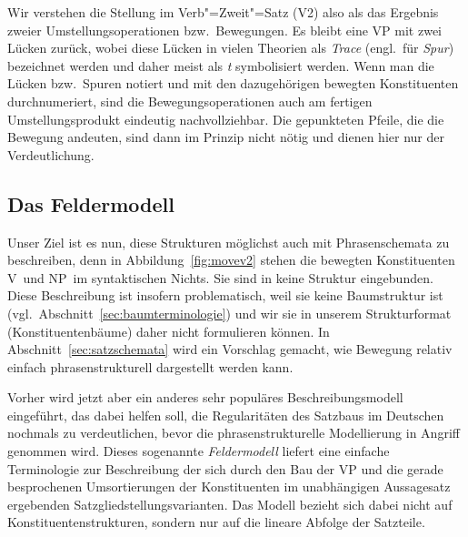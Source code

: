 
Wir verstehen die Stellung im Verb"=Zweit"=Satz (V2) also als das Ergebnis zweier Umstellungsoperationen bzw.\ Bewegungen.
Es bleibt eine VP mit zwei Lücken zurück, wobei diese Lücken in vielen Theorien als \textit{Trace} (engl.\ für \textit{Spur}) bezeichnet werden und daher meist als \textit{t} symbolisiert werden.
Wenn man die Lücken bzw.\ Spuren notiert und mit den dazugehörigen bewegten Konstituenten durchnumeriert, sind die Bewegungsoperationen auch am fertigen Umstellungsprodukt eindeutig nachvollziehbar.
Die gepunkteten Pfeile, die die Bewegung andeuten, sind dann im Prinzip nicht nötig und dienen hier nur der Verdeutlichung.

\subsection{Das Feldermodell}

Unser Ziel ist es nun, diese Strukturen möglichst auch mit Phrasenschemata zu beschreiben, denn in Abbildung~\ref{fig:movev2} stehen die bewegten Konstituenten V\ORi\ und NP\ORii\ im syntaktischen Nichts.
Sie sind in keine Struktur eingebunden.
Diese Beschreibung ist insofern problematisch, weil sie keine Baumstruktur ist (vgl.\ Abschnitt~\ref{sec:baumterminologie}) und wir sie in unserem Strukturformat (Konstituentenbäume) daher nicht formulieren können.
In Abschnitt~\ref{sec:satzschemata} wird ein Vorschlag gemacht, wie Bewegung relativ einfach phrasenstrukturell dargestellt werden kann.

Vorher wird jetzt aber ein anderes sehr populäres Beschreibungsmodell eingeführt, das dabei helfen soll, die Regularitäten des Satzbaus im Deutschen nochmals zu verdeutlichen, bevor die phrasenstrukturelle Modellierung in Angriff genommen wird.
Dieses sogenannte \textit{Feldermodell} liefert eine einfache Terminologie zur Beschreibung der sich durch den Bau der VP und die gerade besprochenen Umsortierungen der Konstituenten im unabhängigen Aussagesatz ergebenden Satzgliedstellungsvarianten.
Das Modell bezieht sich dabei nicht auf Konstituentenstrukturen, sondern nur auf die lineare Abfolge der Satzteile.



